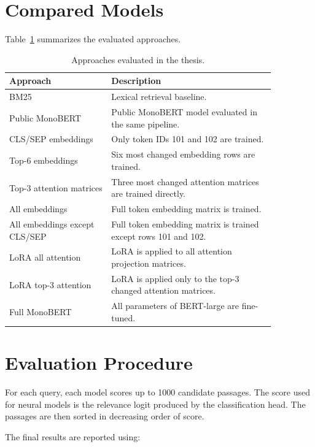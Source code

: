 \section{Compared Models}
\label{sec:experiments_compared_models}

Table~\ref{tab:experiments_models} summarizes the evaluated approaches.

\begin{table}[ht]
\centering
\small
\begin{tabular}{p{0.33\linewidth}p{0.53\linewidth}}
\hline
\textbf{Approach} & \textbf{Description} \\
\hline
BM25 & Lexical retrieval baseline. \\
Public MonoBERT & Public MonoBERT model evaluated in the same pipeline. \\
CLS/SEP embeddings & Only token IDs 101 and 102 are trained. \\
Top-6 embeddings & Six most changed embedding rows are trained. \\
Top-3 attention matrices & Three most changed attention matrices are trained directly. \\
All embeddings & Full token embedding matrix is trained. \\
All embeddings except CLS/SEP & Full token embedding matrix is trained except rows 101 and 102. \\
LoRA all attention & LoRA is applied to all attention projection matrices. \\
LoRA top-3 attention & LoRA is applied only to the top-3 changed attention matrices. \\
Full MonoBERT & All parameters of BERT-large are fine-tuned. \\
\hline
\end{tabular}
\caption{Approaches evaluated in the thesis.}
\label{tab:experiments_models}
\end{table}

\section{Evaluation Procedure}
\label{sec:experiments_evaluation_procedure}

For each query, each model scores up to 1000 candidate passages. The score used for neural models is the relevance logit produced by the classification head. The passages are then sorted in decreasing order of score.

The final results are reported using:

